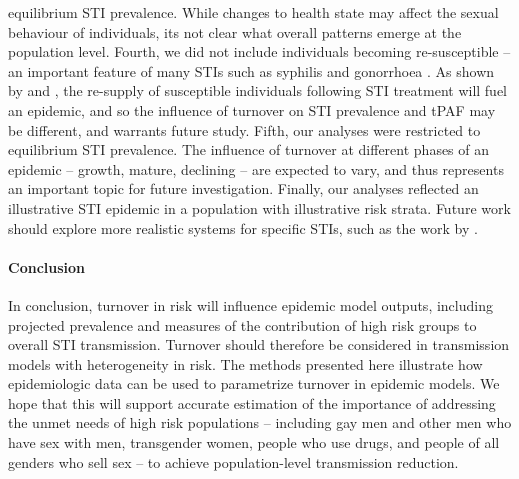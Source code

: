 equilibrium STI prevalence.
While changes to health state may affect the sexual behaviour of individuals,
its not clear what overall patterns emerge at the population level.
Fourth, we did not include individuals becoming re-susceptible
-- an important feature of many STIs such as syphilis and gonorrhoea
\citep{Fenton2008}.
As shown by \citet{Fenton2008} and \citet{Pourbohloul2003},
the re-supply of susceptible individuals following STI treatment
will fuel an epidemic, and so the influence of turnover on
STI prevalence and tPAF may be different, and warrants future study.
Fifth, our analyses were restricted to equilibrium STI prevalence.
The influence of turnover at different phases of an epidemic
-- growth, mature, declining --
are expected to vary, and thus represents an important topic for future investigation.
Finally, our analyses reflected an illustrative STI epidemic
in a population with illustrative risk strata.
Future work should explore more realistic systems for specific STIs,
such as the work by \citet{Johnson2016}.
\paragraph{Conclusion}
In conclusion, turnover in risk will influence
epidemic model outputs, including projected prevalence and
measures of the contribution of high risk groups to overall STI transmission.
Turnover should therefore be considered in
transmission models with heterogeneity in risk.
The methods presented here illustrate how
epidemiologic data can be used to parametrize
turnover in epidemic models.
We hope that this will support accurate estimation of
the importance of addressing the unmet needs of high risk populations
-- including
gay men and other men who have sex with men,
transgender women,
people who use drugs, and
people of all genders who sell sex
-- to achieve population-level transmission reduction.